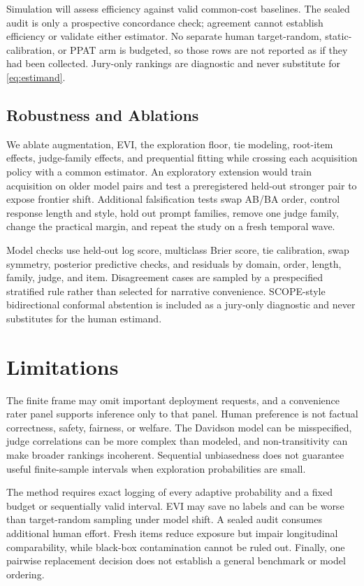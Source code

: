 \documentclass{article}
\begin{document}
Simulation will assess efficiency against valid common-cost baselines. The
sealed audit is only a prospective concordance check; agreement cannot
establish efficiency or validate either estimator. No separate human
target-random, static-calibration, or PPAT arm is budgeted, so those rows are
not reported as if they had been collected. Jury-only rankings are diagnostic
and never substitute for \cref{eq:estimand}.

\subsection{Robustness and Ablations}

We ablate augmentation, EVI, the exploration floor, tie modeling, root-item
effects, judge-family effects, and prequential fitting while crossing each
acquisition policy with a common estimator. An exploratory extension would
train acquisition on older model pairs and test a preregistered held-out
stronger pair to expose frontier
shift. Additional falsification tests swap AB/BA order, control response length
and style, hold out prompt families, remove one judge family, change the
practical margin, and repeat the study on a fresh temporal wave.

Model checks use held-out log score, multiclass Brier score, tie calibration,
swap symmetry, posterior predictive checks, and residuals by domain, order,
length, family, judge, and item. Disagreement cases are sampled by a
prespecified stratified rule rather than selected for narrative convenience.
SCOPE-style bidirectional conformal abstention is included as a jury-only
diagnostic and never substitutes for the human estimand.

\section{Limitations}
\label{sec:limitations}

The finite frame may omit important deployment requests, and a convenience
rater panel supports inference only to that panel. Human preference is not
factual correctness, safety, fairness, or welfare. The Davidson model can be
misspecified, judge correlations can be more complex than modeled, and
non-transitivity can make broader rankings incoherent. Sequential unbiasedness does
not guarantee useful finite-sample intervals when exploration probabilities
are small.

The method requires exact logging of every adaptive probability and a fixed
budget or sequentially valid interval. EVI may save no labels and can be worse
than target-random sampling under model shift. A sealed audit consumes additional
human effort. Fresh items reduce exposure but impair longitudinal
comparability, while black-box contamination cannot be ruled out. Finally, one
pairwise replacement decision does not establish a general benchmark or model
ordering.
\end{document}
